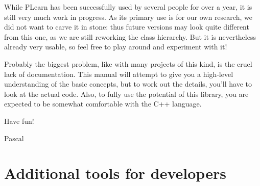 \documentclass[11pt]{book}
\begin{document}
While PLearn has been successfully used by several people for over
a year, it is still very much work in progress. As its primary use
is for our own research, we did not want to carve it in stone: thus
future versions may look quite different from this one, as we are still
reworking the class hierarchy. But it is nevertheless already very
usable, so feel free to play around and experiment with it!


Probably the biggest problem, like with many projects of this kind, is
the cruel lack of documentation. This manual will attempt to give you
a high-level understanding of the basic concepts, but to work out the
details, you'll have to look at the actual code. Also, to fully use the
potential of this library, you are expected to be somewhat comfortable
with the C++ language.


Have fun!


Pascal

\iffalse

\section{Developer CVS access}

If you are going to contribute to PLearn on SourceForge
(\url{http://www.sourceforge.net}):
\begin{itemize}
\item If you don't have one already, create a SourceForge account for yourself
\item Send me ({\tt plearner@users.sourceforge.net}) your account login,
so that I can add you to the developer list.
\item Make sure the {\tt CVS\_RSH} environment variable is set to
{\tt ssh} in your .cshrc or .bashrc
\item Check-out PLearn as follows:
\begin{verbatim}
cvs -d :ext:your_sourceforge_login@cvs.sourceforge.net:/cvsroot/plearn co PLearn
\end{verbatim}
\end{itemize}

\fi

\section{Additional tools for developers}
\end{document}
